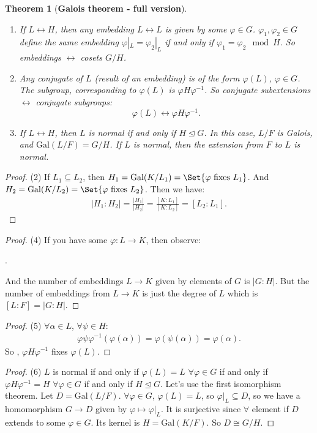 \documentclass[9pt,reqno,twoside]{amsbook}
\theoremstyle{plain}
\newtheorem{theorem}{Theorem}[chapter]
\numberwithin{section}{chapter}
\numberwithin{equation}{chapter}
\theoremstyle{definition}
\theoremstyle{remark}
\theoremstyle{plain}
\newcommand{\norm}{\trianglelefteq}
\newcommand{\sub}{\subseteq}
\newcommand{\bee}{\begin{equation}\begin{aligned}}
\newcommand{\eee}{\end{aligned}\end{equation}}
\newcommand{\fracc}{\frac}
\newcommand{\gal}{\mathrm{Gal}}
\renewcommand{\phi}{\varphi}
\begin{document}
\begin{theorem}[\textbf{Galois theorem - full version}]
\begin{enumerate}
\item If $L \leftrightarrow H$, then any embedding $L \leftrightarrow L$ is given by some $\phi \in G$. $\phi_1,\phi_2 \in G$ define the same embedding $\phi|_{L} = \phi_2|_L$ if and only if $\phi_1 = \phi_2 \mod H$. So embeddings $\leftrightarrow$ cosets $G/H$. 

 \item Any conjugate of $L$ (result of an embedding) is of the form $\phi(L)$, $\phi \in G$. The subgroup, corresponding to $\phi(L)$ is $\phi H \phi^{-1}$. So conjugate subextensions $\leftrightarrow$ conjugate subgroups:
$$
\phi(L) \leftrightarrow \phi H\phi^{-1}.
$$

\item If $L \leftrightarrow H$, then $L$ is normal if and only if $H \norm G$. In this case, $L/F$ is Galois, and $\gal(L/F) = G/H$. If $L$ is normal, then the extension from $F$ to $L$ is normal. 
\end{enumerate}
\end{theorem}
\begin{proof}
(2) If $L_1 \sub L_2$, then $H_1 = \gal(K/L_1) = \Set{\phi \text{ fixes }L_1}$. And $H_2 = \gal(K/L_2) = \Set{\phi \text{ fixes } L_2}$. Then we have:
\bee
|H_1:H_2| = \fracc{|H_1|}{|H_2|} = \fracc{[K:L_1]}{[K:L_2]} = [L_2:L_1].
\eee
\end{proof}

\begin{proof}
(4) If you have some $\phi:L \to K$, then observe:
\begin{center}
.
\end{center}
And the number of embeddings $L \to K$ given by elements of $G$ is $|G:H|$. But the number of embeddings from $L \to K$ is just the degree of $L$ which is $[L:F] = |G:H|$. 
\end{proof}

\begin{proof}
(5) $\forall \alpha \in L$, $\forall \psi \in H$:
\bee
\phi\psi\phi^{-1}(\phi(\alpha)) = \phi(\psi(\alpha)) = \phi(\alpha).
\eee
So , $\phi H \phi^{-1}$ fixes $\phi(L)$. 
\end{proof}


\begin{proof}
(6) $L$ is normal if and only if $\phi(L) = L$ $\forall \phi \in G$ if and only if $\phi H \phi^{-1} = H$ $\forall \phi \in G$ if and only if $H \norm G$. Let's use the first isomorphism theorem. Let $D = \gal(L/F)$. $\forall \phi \in G$, $\phi(L) = L$, so $\phi|_L \sub D$, so we have a homomorphism $G \to D$ given by $\phi \mapsto \phi|_L$. It is surjective since $\forall$ element if $D$ extends to some $\phi \in G$. Its kernel is $H = \gal(K/F)$. So $D \cong G/H$. 
\end{proof}
\end{document}
